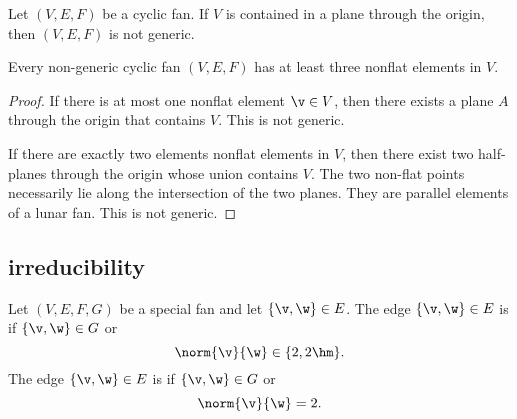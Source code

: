 \begin{lemma}
Let $(V,E,F)$ be a cyclic fan.  If $V$ is contained in a plane
through the origin, then $(V,E,F)$ is not generic.
\end{lemma}

\begin{lemma}\label{lemma:3-nonflat}
Every non-generic cyclic fan $(V,E,F)$ has at least three nonflat
elements in $V$.
\end{lemma}

\begin{proof}
If there is at most one nonflat element $\v\in V$, then there exists
a plane $A$ through the origin that contains $V$.  This is not
generic.

If there are exactly two elements nonflat elements in $V$, then
there exist two half-planes through the origin whose union contains
$V$.  The two non-flat points necessarily lie along the intersection
of the two planes.  They are parallel elements of a lunar fan.
This is not generic.
\end{proof}

\subsection{irreducibility}

\begin{definition} Let $(V,E,F,G)$ be a special fan
and let $\{\v,\w\}\in E$.  The edge $\{\v,\w\}\in E$ is
 if $\{\v,\w\}\in G$ or
\begin{displaymath}
\norm{\v}{\w}\in\{2,2\hm\}.
\end{displaymath}
The edge $\{\v,\w\}\in E$ is  if $\{\v,\w\}\in G$ or
\begin{displaymath}
\norm{\v}{\w}=2.
\end{displaymath}
\end{definition}

